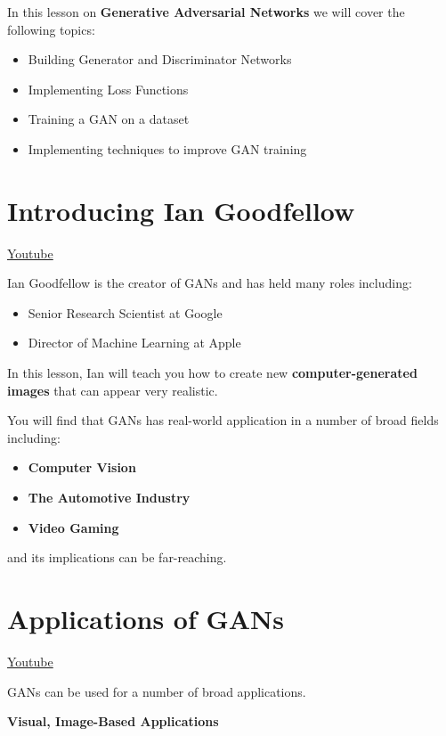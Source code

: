 In this lesson on \textbf{Generative Adversarial Networks} we will cover the following topics:

\begin{itemize}
    \item Building Generator and Discriminator Networks
    \item Implementing Loss Functions
    \item Training a GAN on a dataset
    \item Implementing techniques to improve GAN training
\end{itemize}

\section{Introducing Ian Goodfellow}
\href{https://www.youtube.com/watch?v=r6tq6-L8Qk0}{Youtube} \newline

Ian Goodfellow is the creator of GANs and has held many roles including:

\begin{itemize}
    \item Senior Research Scientist at Google
    \item Director of Machine Learning at Apple
\end{itemize}
In this lesson, Ian will teach you how to create new \textbf{computer-generated images} that can appear very realistic.

You will find that GANs has real-world application in a number of broad fields including:

\begin{itemize}
    \item \textbf{Computer Vision}
    \item \textbf{The Automotive Industry}
    \item \textbf{Video Gaming}
\end{itemize}
and its implications can be far-reaching.

\section{Applications of GANs}
\href{https://www.youtube.com/watch?v=dW2puRa-yqo}{Youtube} \newline

GANs can be used for a number of broad applications. \newline

\textbf{Visual, Image-Based Applications}


